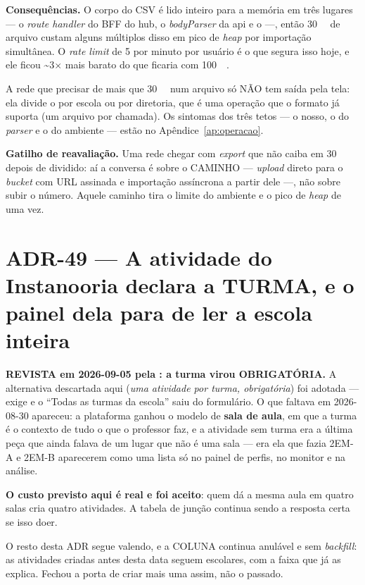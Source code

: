 \textbf{Consequências.} O corpo do CSV é lido inteiro para a memória em três
lugares --- o \emph{route handler} do BFF do hub, o \emph{bodyParser} da api e o
 ---, então \SI{30}{\mega\byte} de arquivo custam alguns múltiplos
disso em pico de \emph{heap} por importação simultânea. O \emph{rate limit} de
5 por minuto por usuário é o que segura isso hoje, e ele ficou
\textasciitilde3$\times$ mais barato do que ficaria com
\SI{100}{\mega\byte}.

A rede que precisar de mais que \SI{30}{\mega\byte} num arquivo só NÃO tem
saída pela tela: ela divide o  por escola ou por diretoria,
que é uma operação que o formato já suporta (um arquivo por chamada). Os
sintomas dos três tetos --- o nosso, o do \emph{parser} e o do ambiente ---
estão no Apêndice~\ref{ap:operacao}.

\textbf{Gatilho de reavaliação.} Uma rede chegar com \emph{export} que não caiba
em \SI{30}{\mega\byte} depois de dividido: aí a conversa é sobre o CAMINHO ---
\emph{upload} direto para o \emph{bucket} com URL assinada e importação
assíncrona a partir dele ---, não sobre subir o número. Aquele caminho tira o
limite do ambiente e o pico de \emph{heap} de uma vez.

\section{ADR-49 --- A atividade do Instanooria declara a TURMA, e o painel dela
para de ler a escola inteira}
\label{adr:atividade-por-turma}

\begin{atencao}
\textbf{REVISTA em 2026-09-05 pela : a turma virou
OBRIGATÓRIA.} A alternativa descartada aqui (\emph{uma atividade por turma,
obrigatória}) foi adotada ---  exige  e o
\enquote{Todas as turmas da escola} saiu do formulário. O que faltava em
2026-08-30 apareceu: a plataforma ganhou o modelo de \textbf{sala de aula}, em
que a turma é o contexto de tudo o que o professor faz, e a atividade sem turma
era a última peça que ainda falava de um lugar que não é uma sala --- era ela
que fazia 2EM-A e 2EM-B aparecerem como uma lista só no painel de perfis, no
monitor e na análise.

\textbf{O custo previsto aqui é real e foi aceito}: quem dá a mesma aula em
quatro salas cria quatro atividades. A tabela de junção continua sendo a
resposta certa se isso doer.

O resto desta ADR segue valendo, e a COLUNA continua anulável e sem
\emph{backfill}: as atividades criadas antes desta data seguem escolares, com a
faixa que já as explica. Fechou a porta de criar mais uma assim, não o passado.
\end{atencao}

